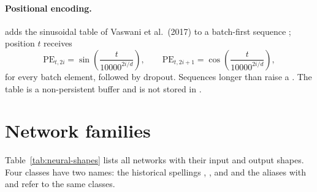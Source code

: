 \paragraph{Positional encoding.}
 adds the
sinusoidal table of Vaswani et al.\ (2017) to a batch-first sequence
; position $t$ receives
\begin{equation}
  \mathrm{PE}_{t,2i} = \sin\!\left(\frac{t}{10000^{2i/d}}\right), \qquad
  \mathrm{PE}_{t,2i+1} = \cos\!\left(\frac{t}{10000^{2i/d}}\right),
\end{equation}
for every batch element, followed by dropout. Sequences longer than
 raise a . The table is a non-persistent
buffer and is not stored in .

\section{Network families}\label{sec:neural-networks}

Table~\ref{tab:neural-shapes} lists all networks with their input and output
shapes. Four classes have two names: the historical spellings
, ,  and
 and the aliases with  and  refer to the
same classes.

